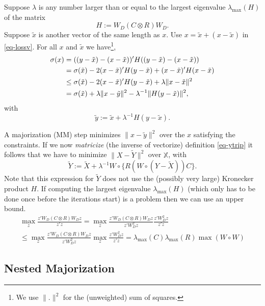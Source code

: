 \documentclass[
  12pt,
  letterpaper,
  DIV=11,
  numbers=noendperiod]{scrartcl}
\begin{document}
Suppose \(\lambda\) is any number larger than or equal to the largest
eigenvalue \(\lambda_{\text{max}}(H)\) of the matrix \begin{equation}
H:=W_D(C\otimes R)W_D.\label{eq-hdef}
\end{equation} Suppose \(\tilde x\) is another vector of the same length
as \(x\). Use \(x=\tilde x+(x-\tilde x)\) in \eqref{eq-lossv}. For all
\(x\) and \(\tilde x\) we
have\footnote{We use $\|.\|^2$ for the (unweighted)
sum of squares.}, \begin{align}
\sigma(x)&=((y-\tilde x)-(x-\tilde x))'H((y-\tilde x)-(x-\tilde x))\notag\\
&=\sigma(\tilde x)-2(x-\tilde x)'H(y-\tilde x)+(x-\tilde x)'H(x-\tilde x)\notag\\
&\leq\sigma(\tilde x)-2(x-\tilde x)'H(y-\tilde x)+\lambda\|x-\tilde x\|^2\notag\\
&=\sigma(\tilde x)+\lambda\|x-\tilde y\|^2-\lambda^{-1}\|H(y-\tilde x)\|^2,
\end{align} with \begin{equation}
\tilde y:=\tilde x+\lambda^{-1}H(y-\tilde x).\label{eq-ytrip}
\end{equation}

A majorization (MM) step minimizes \(\|x-\tilde y\|^2\) over the \(x\)
satisfying the constraints. If we now \emph{matricize} (the inverse of
vectorize) definition \eqref{eq-ytrip} it follows that we have to
minimize \(\|X-\tilde Y\|^2\) over \(\mathbb{X}\), with \begin{equation}
\tilde Y:=\tilde X+\lambda^{-1}W\circ\{R(W\circ(Y-\tilde X))C\}.
\end{equation} Note that this expression for \(\tilde Y\) does not use
the (possibly very large) Kronecker product \(H\). If computing the
largest eigenvalue \(\lambda_{\text{max}}(H)\) (which only has to be
done once before the iterations start) is a problem then we can use an
upper bound. \begin{multline}
\max_z\frac{z'W_D(C\otimes R)W_Dz}{z'z}=\max_z\frac{z'W_D(C\otimes R)W_Dz}{z'W_D^2z}\frac{z'W_D^2z}{z'z}\\
\leq\max_z\frac{z'W_D(C\otimes R)W_Dz}{z'W_D^2z}\max_z\frac{z'W_D^2z}{z'z}
=\lambda_{\text{max}}(C)\lambda_{\text{max}}(R)\max(W\circ W)
\end{multline}

\subsection{Nested Majorization}\label{nested-majorization}
\end{document}
